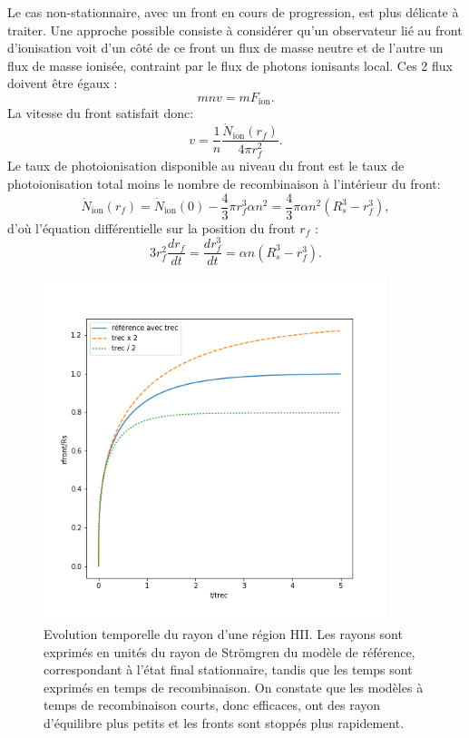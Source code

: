 Le cas non-stationnaire, avec un front en cours de progression, est plus délicate à traiter. Une approche possible consiste à considérer qu'un observateur lié au front d'ionisation voit d'un côté de ce front un flux de masse neutre et de l'autre un flux de masse ionisée, contraint par le flux de photons ionisants local. Ces 2 flux doivent être égaux :
\begin{equation}
m n v = m F_\mathrm{ion}.
\end{equation}
La vitesse du front satisfait donc:
\begin{equation}
v=\frac{1}{n}\frac{\dot N_\mathrm{ion}(r_f)}{4\pi r_f^2}.
\end{equation}
Le taux de photoionisation disponible au niveau du front est le taux de photoionisation total moins le nombre de recombinaison à l'intérieur du front:
\begin{equation}
\dot N_\mathrm{ion}(r_f)=\dot N_\mathrm{ion}(0)-\frac{4}{3}\pi r_f^3\alpha n^2=\frac{4}{3}\pi \alpha n^2 (R_s^3-r_f^3),
\end{equation}
d'où l'équation différentielle sur la position du front $r_f$ :
\begin{equation}
3r_f^2\frac{d r_f}{dt}=\frac{dr_f^3}{dt}=\alpha n  (R_s^3-r_f^3).
\end{equation}

\begin{figure}[htbp]
	\centering
		\includegraphics[height=10cm]{figs/strom.png}
		\caption[Evolution temporelle de la position d'un front ionisant]{Evolution temporelle du rayon d'une région HII. Les rayons sont exprimés en unités du rayon de Strömgren du modèle de référence, correspondant à l'état final stationnaire, tandis que les temps sont exprimés en temps de recombinaison. On constate que les modèles à temps de recombinaison courts, donc efficaces, ont des rayon d'équilibre plus petits et les fronts sont stoppés plus rapidement.}
	\label{f:strom}
\end{figure}

